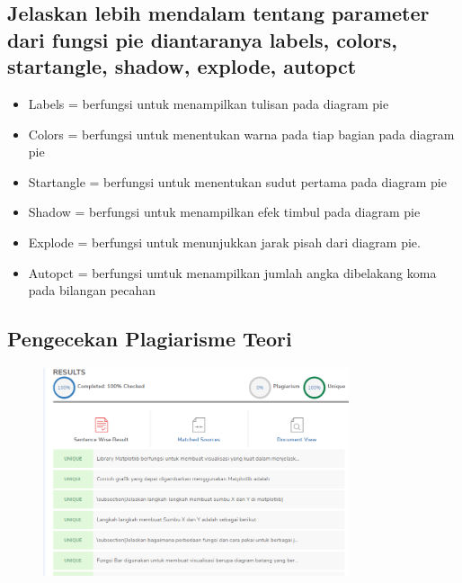 \subsection{Jelaskan lebih mendalam tentang parameter dari fungsi pie diantaranya labels, colors, startangle, shadow, explode, autopct}
\begin{itemize}
    \item Labels = berfungsi untuk menampilkan tulisan pada diagram pie
    \item Colors = berfungsi untuk menentukan warna pada tiap bagian pada diagram pie
    \item Startangle = berfungsi untuk menentukan sudut pertama pada diagram pie
    \item Shadow = berfungsi untuk menampilkan efek timbul pada diagram pie
    \item Explode = berfungsi untuk menunjukkan jarak pisah dari diagram pie.
    \item Autopct = berfungsi umtuk menampilkan jumlah angka dibelakang koma pada bilangan pecahan
\end{itemize}

\subsection{Pengecekan Plagiarisme Teori}
\begin{figure}[H]
    \includegraphics[width=9cm]{figures/6/Teori/1174038/plagiat.png}
    \centering
\end{figure}
